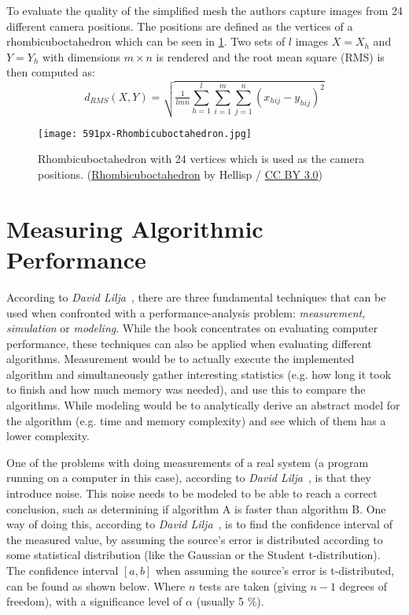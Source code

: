 To evaluate the quality of the simplified mesh the authors capture images from 24 different camera positions. The positions are defined as the vertices of a rhombicuboctahedron which can be seen in \cref{fig:rhombicuboctahedron}. Two sets of $l$ images $X = {X_h}$ and $Y = {Y_h}$ with dimensions $m \times n$ is rendered and the root mean square (RMS) is then computed as:
\begin{equation}  \label{eq:rms_image_sets}
  d_{RMS}(X,Y) = \sqrt{\tfrac{1}{lmn}\sum^l_{h=1}\sum^m_{i=1}\sum^n_{j=1}(x_{hij} - y_{hij})^2}
\end{equation}

\begin{figure}[ht]
    \centering
    \texttt{[image: 591px-Rhombicuboctahedron.jpg]}
    \caption[Rhombicuboctahedron]{Rhombicuboctahedron with 24 vertices which is used as the camera positions. 
      (\href{https://commons.wikimedia.org/wiki/File:Rhombicuboctahedron.jpg}{Rhombicuboctahedron} by Hellisp / \href{https://creativecommons.org/licenses/by/3.0/}{CC BY 3.0})}
    \label{fig:rhombicuboctahedron}
\end{figure}

\section{Measuring Algorithmic Performance} \label{sec:measuring_algorithmic_performance}

According to \emph{David Lilja}~\cite[p.~4]{lilja2005measuring}, there are three fundamental techniques that can be used when confronted with a performance-analysis problem: \emph{measurement}, \emph{simulation} or \emph{modeling}. While the book concentrates on evaluating computer performance, these techniques can also be applied when evaluating different algorithms. Measurement would be to actually execute the implemented algorithm and simultaneously gather interesting statistics (e.g. how long it took to finish and how much memory was needed), and use this to compare the algorithms. While modeling would be to analytically derive an abstract model for the algorithm (e.g. time and memory complexity) and see which of them has a lower complexity.

One of the problems with doing measurements of a real system (a program running on a computer in this case), according to \emph{David Lilja}~\cite[p.~43]{lilja2005measuring}, is that they introduce noise. This noise needs to be modeled to be able to reach a correct conclusion, such as determining if algorithm A is faster than algorithm B. One way of doing this, according to \emph{David Lilja}~\cite[p.~48]{lilja2005measuring}, is to find the confidence interval of the measured value, by assuming the source's error is distributed according to some statistical distribution (like the Gaussian or the Student t-distribution). The confidence interval \([a,b]\) when assuming the source's error is t-distributed, can be found as shown below. Where \(n\) tests are taken (giving \(n-1\) degrees of freedom), with a significance level of \(\alpha\) (usually 5 \%).

